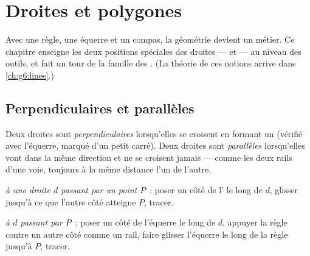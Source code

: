 \chapter{Droites et polygones}\label{ch:g4:geometry}

Avec une règle, une équerre et un compas, la géométrie devient un
métier. Ce chapitre enseigne les deux positions spéciales des
droites ---  et  --- au niveau des
outils, et fait un tour de la famille des . (La théorie de
ces notions arrive dans \cref{ch:g6:lines}.)

\section{Perpendiculaires et parallèles}

\begin{definition}\label{def:g4:geometry:def}
Deux droites sont \emph{perpendiculaires}
lorsqu'elles se croisent en formant un  (vérifié avec
l'équerre, marqué d'un petit carré). Deux droites sont
\emph{parallèles} lorsqu'elles vont dans
la même direction et ne se croisent jamais --- comme les deux rails
d'une voie, toujours à la même distance l'un de l'autre.
\end{definition}

\begin{method}\label{met:g4:geometry:draw}
\emph{ à une droite $d$ passant par un point $P$}~:
poser un côté de l' le long de $d$, glisser jusqu'à ce
que l'autre côté atteigne $P$, tracer.

\emph{ à $d$ passant par $P$}~: poser un côté de l'équerre
le long de $d$, appuyer la règle contre un autre côté comme un
rail, faire glisser l'équerre le long de la règle jusqu'à $P$,
tracer.
\end{method}

